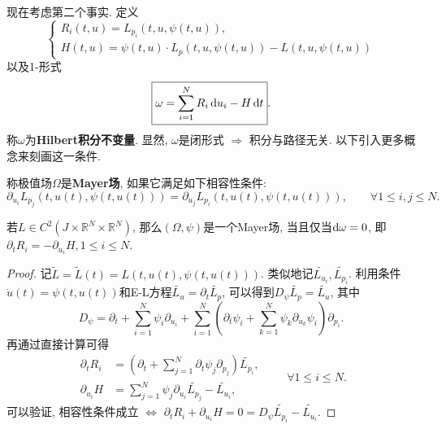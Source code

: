 现在考虑第二个事实. 定义 
\begin{equation*}
    \begin{cases} 
        R_i(t, u) = L_{p_i}(t, u, \psi(t, u)), \\  
        H(t, u) = \psi(t, u) \cdot L_p(t, u, \psi(t, u)) - L(t, u, \psi(t, u)) 
    \end{cases}
\end{equation*}
以及1-形式 
\begin{equation*}
    \boxed{\omega = \sum\limits_{i = 1}^NR_i \,{\rm d}u_i - H \,{\rm d}t}.
\end{equation*}
称$\omega$为\textbf{Hilbert积分不变量}. 显然, $\omega$是闭形式 $\Rightarrow$ 积分与路径无关.
以下引入更多概念来刻画这一条件.

\begin{definition}
    称极值场$\Omega$是\textbf{Mayer场}, 如果它满足如下相容性条件:
    \begin{equation*}
        \boxed{\partial_{u_i}L_{p_j}(t, u(t), \psi(t, u(t))) = \partial_{u_j}L_{p_i}(t, u(t), \psi(t, u(t))), \qquad \forall 1 \leq i, j \leq N.} 
    \end{equation*}
\end{definition}

\begin{proposition}[Mayer场的等价刻画]
    若$L \in C^2(J \times \mathbb{R}^N \times \mathbb{R}^N)$, 那么$(\Omega, \psi)$是一个Mayer场, 当且仅当${\rm d}\omega = 0$, 即$\partial_tR_i = -\partial_{u_i}H,1 \leq i \leq N$.
    \begin{proof}
        记$\widetilde{L} = \widetilde{L}(t) = L(t, u(t), \psi(t, u(t)))$. 类似地记$\widetilde{L_{u_i}}, \widetilde{L_{p_i}}$.
        利用条件$\dot u(t) = \psi(t, u(t))$和E-L方程$\widetilde{L_u} = \partial_t\widetilde{L_p}$, 可以得到$D_{\psi}\widetilde{L_p} = \widetilde{L_u}$, 其中 
        \begin{equation*}
            D_{\psi} = \partial_t + \sum\limits_{i = 1}^N\psi_i\partial_{u_i} + \sum\limits_{i = 1}^N\left(\partial_t\psi_i + \sum\limits_{k = 1}^N\psi_k\partial_{u_k}\psi_i\right)\partial_{p_i}. 
        \end{equation*}
        再通过直接计算可得
        \begin{equation*} 
            \begin{aligned} 
                \partial_tR_i &= \left(\partial_t + \sum_{j = 1}^N\partial_t\psi_j\partial_{p_j}\right)\widetilde{L_{p_i}}, \\ 
                \partial_{u_i}H &= \sum_{j = 1}^N\psi_j\partial_{u_i}\widetilde{L_{p_j}} - \widetilde{L_{u_i}}, 
            \end{aligned}  
            \qquad \forall 1 \leq i \leq N. 
        \end{equation*}
        可以验证, 相容性条件成立 $\Leftrightarrow$ $\partial_tR_i + \partial_{u_i}H = 0 =  D_{\psi}\widetilde{L_{p_i}} - \widetilde{L_{u_i}}$.
    \end{proof}
\end{proposition}

